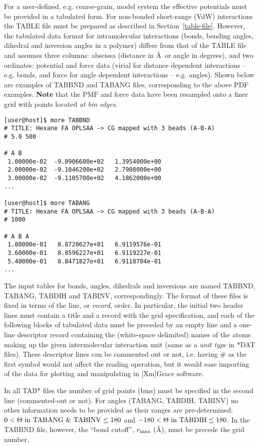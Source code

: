 For a user-defined, e.g. coarse-grain, model system 
the effective potentials must be provided in a tabulated form. 
For non-bonded short-range (VdW) interactions the TABLE file 
must be prepared as described in Section~\ref{table-file}. 
However, the tabulated data format for intramolecular 
interactions (bonds, bending angles, dihedral and inversion 
angles in a polymer) differs from that of the TABLE file and 
assumes three columns: abscissa (distance in \AA~or angle 
in degrees), and two ordinates: potential and force data 
(virial for distance dependent interactions -- e.g. bonds,
and force for angle dependent interactions -- e.g. angles).  
Shown below are examples of TABBND and TABANG files, 
corresponding to the above PDF examples. {\bf Note} that 
the PMF and force data have been resampled onto a finer grid
with points located {\em at bin edges}.

\begin{verbatim}
[user@host]$ more TABBND
# TITLE: Hexane FA OPLSAA -> CG mapped with 3 beads (A-B-A)
# 5.0 500

# A B
 1.00000e-02  -9.0906600e+02   1.3954000e+00
 2.00000e-02  -9.1046200e+02   2.7908000e+00
 3.00000e-02  -9.1185700e+02   4.1862000e+00
...

[user@host]$ more TABANG
# TITLE: Hexane FA OPLSAA -> CG mapped with 3 beads (A-B-A)
# 1000

# A B A
 1.80000e-01   8.8720627e+01   6.9119576e-01
 3.60000e-01   8.8596227e+01   6.9119227e-01
 5.40000e-01   8.8471827e+01   6.9118704e-01
...
\end{verbatim}

The input tables for bonds, angles, dihedrals and inversions are 
named TABBND, TABANG, TABDIH and TABINV, correspondingly. 
The format of these files is fixed in terms of the line, 
or {\em record}, order. In particular, the initial two 
header lines must contain a title and a record with the grid 
specification, and each of the following blocks of tabulated 
data must be preceded by an empty line and a one-line 
descriptor record containing the (white-space delimited) names 
of the atoms making up the given intermolecular interaction 
unit (same as a {\em unit type} in *DAT files). These descriptor 
lines can be commented out or not, i.e. having \# as the first 
symbol would not affect the reading operation, but it would 
ease importing of the data for plotting and manipulating 
in [Xm]Grace software.

In all TAB* files the number of grid points (bins) must be 
specified in the second line (commented-out or not). For 
angles (TABANG, TABDIH, TABINV) no other information needs 
to be provided as their ranges are pre-determined: 
$0 < {\Theta\ \rm in\ TABANG\ \&\ TABINV} \le 180$ 
and  $-180 < {\Theta\ \rm in\ TABDIH} \le 180$. In the TABBND 
file, however, the ``bond cutoff'', $r_{\rm max}$ (\AA), 
must be precede the grid number. 

